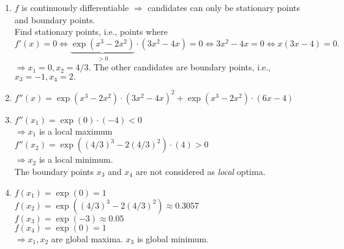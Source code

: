 \documentclass[a4paper]{article}
\makeatletter
\newcommand{\hlnum}[1]{\textcolor[rgb]{0.686,0.059,0.569}{#1}}%
\newcommand{\hlstr}[1]{\textcolor[rgb]{0.192,0.494,0.8}{#1}}%
\newcommand{\hlopt}[1]{\textcolor[rgb]{0,0,0}{#1}}%
\newcommand{\hlstd}[1]{\textcolor[rgb]{0.345,0.345,0.345}{#1}}%
\newcommand{\hlkwc}[1]{\textcolor[rgb]{0.333,0.667,0.333}{#1}}%
\newcommand{\hlkwd}[1]{\textcolor[rgb]{0.737,0.353,0.396}{\textbf{#1}}}%
\newenvironment{kframe}{%
 \def\at@end@of@kframe{}%
 \ifinner\ifhmode%
  \def\at@end@of@kframe{\end{minipage}}%
  \begin{minipage}{\columnwidth}%
 \fi\fi%
 \def\FrameCommand##1{\hskip\@totalleftmargin \hskip-\fboxsep
 \colorbox{shadecolor}{##1}\hskip-\fboxsep
     \hskip-\linewidth \hskip-\@totalleftmargin \hskip\columnwidth}%
 \MakeFramed {\advance\hsize-\width
   \@totalleftmargin\z@ \linewidth\hsize
   \@setminipage}}%
 {\par\unskip\endMakeFramed%
 \at@end@of@kframe}
\newenvironment{knitrout}{}{} %
\makeatother
\begin{document}
{\begin{enumerate}
\begin{knitrout}
\begin{kframe}
\begin{alltt}
  \hlkwd{ggplot}\hlstd{(}\hlkwd{data.frame}\hlstd{(}\hlkwc{x} \hlstd{=} \hlkwd{seq}\hlstd{(}\hlopt{-}\hlnum{1}\hlstd{,} \hlnum{2}\hlstd{,} \hlkwc{by}\hlstd{=}\hlnum{0.005}\hlstd{)),} \hlkwd{aes}\hlstd{(x))} \hlopt{+}
    \hlkwd{geom_function}\hlstd{(}\hlkwc{fun} \hlstd{= f,} \hlkwd{aes}\hlstd{(}\hlkwc{linetype} \hlstd{=} \hlstr{"f"}\hlstd{))} \hlopt{+}
    \hlkwd{geom_function}\hlstd{(}\hlkwc{fun} \hlstd{= df,} \hlkwd{aes}\hlstd{(}\hlkwc{linetype} \hlstd{=} \hlstr{"f'"}\hlstd{))}    \hlopt{+}
    \hlkwd{scale_linetype_discrete}\hlstd{(}\hlkwc{name} \hlstd{=} \hlstr{"Function"}\hlstd{)}
\end{alltt}
\end{kframe}
\texttt{[image: figure/1d-plot-1]} 
\end{knitrout}
	\item $f$ is continuously differentiable $\Rightarrow$ candidates can only be stationary points and boundary points. \\
	Find stationary points, i.e., points where \\ 
	$f'(x) = 0 \iff  \underbrace{\exp(x^3 - 2x^2)}_{>0}\cdot(3x^2 - 4x) = 0 \iff 3x^2 - 4x = 0 \iff x(3x - 4) = 0 .$ \\
	$\Rightarrow x_1 = 0, x_2 = 4/3.$
	The other candidates are boundary points, i.e., $x_3 = -1, x_4 = 2.$
	\item $f''(x) = \exp(x^3 - 2x^2)\cdot(3x^2 - 4x)^2 + \exp(x^3 - 2x^2)\cdot(6x - 4)$ \\
	\item $f''(x_1) = \exp(0)\cdot(- 4) < 0$ \\
	  $\Rightarrow x_1$ is a local maximum \\[\baselineskip]
	  $f''(x_2) = \exp((4/3)^3 - 2(4/3)^2)\cdot(4) > 0$ \\
	  $\Rightarrow x_2$ is a local minimum. \\[\baselineskip]
	  The boundary points $x_3$ and $x_4$ are not considered as \textit{local} optima.
	\item $f(x_1) = \exp(0) = 1$ \\
	 $f(x_2) = \exp((4/3)^3 - 2(4/3)^2) \approx 0.3057$ \\
	  $f(x_3) = \exp(-3) \approx 0.05$ \\
	  $f(x_4) = \exp(0) = 1$ \\
	  $\Rightarrow x_1, x_2$ are global maxima.
	  $x_3$ is global minimum.
	
\end{enumerate}
}
\end{document}
